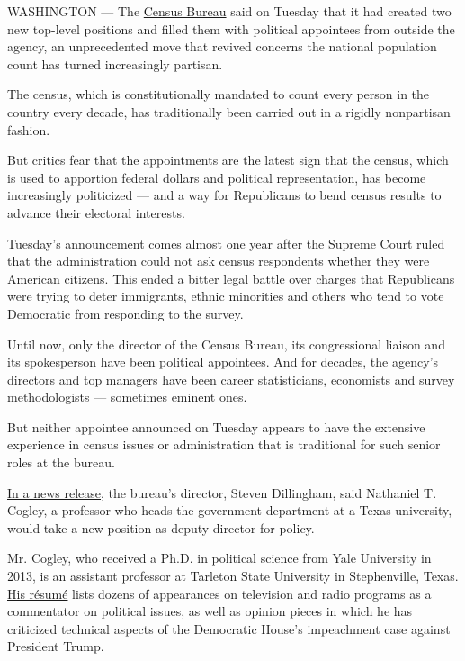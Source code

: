 WASHINGTON --- The
\href{https://www.nytimes3xbfgragh.onion/2020/07/28/us/trump-census.html}{Census
Bureau} said on Tuesday that it had created two new top-level positions
and filled them with political appointees from outside the agency, an
unprecedented move that revived concerns the national population count
has turned increasingly partisan.

The census, which is constitutionally mandated to count every person in
the country every decade, has traditionally been carried out in a
rigidly nonpartisan fashion.

But critics fear that the appointments are the latest sign that the
census, which is used to apportion federal dollars and political
representation, has become increasingly politicized --- and a way for
Republicans to bend census results to advance their electoral interests.

Tuesday's announcement comes almost one year after the Supreme Court
ruled that the administration could not ask census respondents whether
they were American citizens. This ended a bitter legal battle over
charges that Republicans were trying to deter immigrants, ethnic
minorities and others who tend to vote Democratic from responding to the
survey.

Until now, only the director of the Census Bureau, its congressional
liaison and its spokesperson have been political appointees. And for
decades, the agency's directors and top managers have been career
statisticians, economists and survey methodologists --- sometimes
eminent ones.

But neither appointee announced on Tuesday appears to have the extensive
experience in census issues or administration that is traditional for
such senior roles at the bureau.

\href{https://www.census.gov/newsroom/press-releases/2020/statement-new-staff.html}{In
a news release}, the bureau's director, Steven Dillingham, said
Nathaniel T. Cogley, a professor who heads the government department at
a Texas university, would take a new position as deputy director for
policy.

Mr. Cogley, who received a Ph.D. in political science from Yale
University in 2013, is an assistant professor at Tarleton State
University in Stephenville, Texas.
\href{http://nathanielcogley.com/Nathaniel-Terence-Cogley-CV.pdf}{His
résumé} lists dozens of appearances on television and radio programs as
a commentator on political issues, as well as opinion pieces in which he
has criticized technical aspects of the Democratic House's impeachment
case against President Trump.


